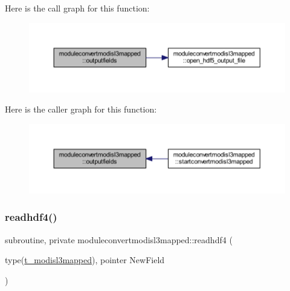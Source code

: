 Here is the call graph for this function\+:\nopagebreak
\begin{figure}[H]
\begin{center}
\leavevmode
\includegraphics[width=350pt]{namespacemoduleconvertmodisl3mapped_ac1aafb9181d66e361d34ec58c03d59bb_cgraph}
\end{center}
\end{figure}
Here is the caller graph for this function\+:\nopagebreak
\begin{figure}[H]
\begin{center}
\leavevmode
\includegraphics[width=350pt]{namespacemoduleconvertmodisl3mapped_ac1aafb9181d66e361d34ec58c03d59bb_icgraph}
\end{center}
\end{figure}
\mbox{\label{namespacemoduleconvertmodisl3mapped_a848303d0a614c18b94629b24f417fee7}} 
\subsubsection{\texorpdfstring{readhdf4()}{readhdf4()}}
{\footnotesize\ttfamily subroutine, private moduleconvertmodisl3mapped\+::readhdf4 (\begin{DoxyParamCaption}\item[{type(\mbox{\hyperlink{structmoduleconvertmodisl3mapped_1_1t__modisl3mapped}{t\+\_\+modisl3mapped}}), pointer}]{New\+Field }\end{DoxyParamCaption})\hspace{0.3cm}{\ttfamily [private]}}


